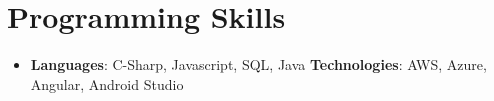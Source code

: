 \documentclass[letterpaper,11pt]{article}
\newcommand{\resumeSubHeadingListStart}{\begin{itemize}[leftmargin=*]}
\newcommand{\resumeSubHeadingListEnd}{\end{itemize}}
\begin{document}
\section{Programming Skills}
  \resumeSubHeadingListStart
    \item{
      \textbf{Languages}{: C-Sharp, Javascript, SQL, Java}
      \hfill
      \textbf{Technologies}{: AWS, Azure, Angular, Android Studio}
    }
  \resumeSubHeadingListEnd

\end{document}
